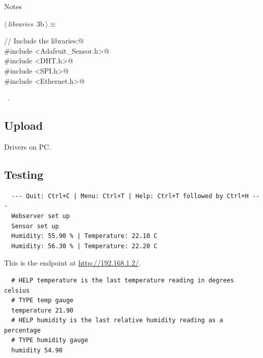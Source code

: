 \documentclass[a4paper, 12pt]{article}
\begin{document}
Notes

\begin{flushleft} \small
\begin{minipage}{\linewidth}\label{scrap2}\raggedright\small
{}$\langle\,${\itshape libraries}\nobreak\ {\footnotesize{3b}}$\,\rangle\equiv$
\vspace{-1ex}
\begin{list}{}{\setlength{\leftmargin}{1em}} \item
\mbox{}\verb@// Include the libraries:@\\
\mbox{}\verb@#include <Adafruit_Sensor.h>@\\
\mbox{}\verb@#include <DHT.h>@\\
\mbox{}\verb@#include <SPI.h>@\\
\mbox{}\verb@#include <Ethernet.h>@\\
\mbox{}{\NWsep}
\end{list}
\vspace{-1ex}
\vspace{-1ex}
\footnotesize
\begin{list}{}{\setlength{\itemsep}{-\parsep}\setlength{\itemindent}{-\leftmargin}}
\item \NWtxtMacroRefIn\ .
\end{list}
\end{minipage}
\end{flushleft}


\subsection{Upload}

Drivers on PC.



\subsection{Testing}

\begin{verbatim}
  --- Quit: Ctrl+C | Menu: Ctrl+T | Help: Ctrl+T followed by Ctrl+H ---
  Webserver set up
  Sensor set up
  Humidity: 55.90 % | Temperature: 22.10 C
  Humidity: 56.30 % | Temperature: 22.20 C
  \end{verbatim}
  
  This is the endpoint at \url{http://192.168.1.2/}.
  
  \begin{verbatim}
  # HELP temperature is the last temperature reading in degrees celsius
  # TYPE temp gauge
  temperature 21.90
  # HELP humidity is the last relative humidity reading as a percentage
  # TYPE humidity gauge
  humidity 54.90
  \end{verbatim}
\end{document}
